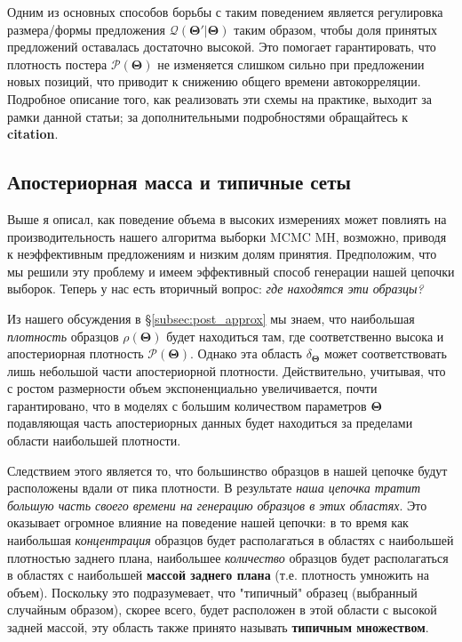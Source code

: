 \documentclass[12pt, titlepage]{article}
\newcommand{\params}{\ensuremath{\boldsymbol\Theta}}
\newcommand{\posterior}{\ensuremath{\mathcal{P}}}
\newcommand{\proposal}{\ensuremath{\mathcal{Q}}}
\begin{document}
Одним из основных способов борьбы с таким поведением является регулировка размера/формы предложения $\proposal(\params'|\params)$ таким образом, чтобы доля принятых предложений оставалась достаточно высокой. Это помогает гарантировать, что плотность постера $\posterior(\params)$ не изменяется слишком сильно при предложении новых позиций, что приводит к снижению общего времени автокорреляции. Подробное описание того, как реализовать эти схемы на практике, выходит за рамки данной статьи; за дополнительными подробностями обращайтесь к \textbf{citation}.

\subsection{Апостериорная масса и типичные сеты} \label{subsec:mass}

Выше я описал, как поведение объема в высоких измерениях может повлиять на производительность нашего алгоритма выборки MCMC MH, возможно, приводя к неэффективным предложениям и низким долям принятия. Предположим, что мы решили эту проблему и имеем эффективный способ генерации нашей цепочки выборок. Теперь у нас есть вторичный вопрос: \textit{где находятся эти образцы?}

Из нашего обсуждения в \S\ref{subsec:post_approx} мы знаем, что наибольшая \textit{плотность} образцов $\rho(\params)$ будет находиться там, где соответственно высока и апостериорная плотность $\posterior(\params)$. Однако эта область $\delta_{\params}$ может соответствовать лишь небольшой части апостериорной плотности. Действительно, учитывая, что с ростом размерности объем экспоненциально увеличивается, почти гарантировано, что в моделях с большим количеством параметров $\params$ подавляющая часть апостериорных данных будет находиться за пределами области наибольшей плотности. 

Следствием этого является то, что большинство образцов в нашей цепочке будут расположены вдали от пика плотности. В результате \textit{наша цепочка тратит большую часть своего времени на генерацию образцов в этих областях}. Это оказывает огромное влияние на поведение нашей цепочки: в то время как наибольшая \textit{концентрация} образцов будет располагаться в областях с наибольшей плотностью заднего плана, наибольшее \textit{количество} образцов будет располагаться в областях с наибольшей \textbf{массой заднего плана} (т.е. плотность умножить на объем). Поскольку это подразумевает, что "типичный" образец (выбранный случайным образом), скорее всего, будет расположен в этой области с высокой задней массой, эту область также принято называть \textbf{типичным множеством}.
\end{document}
